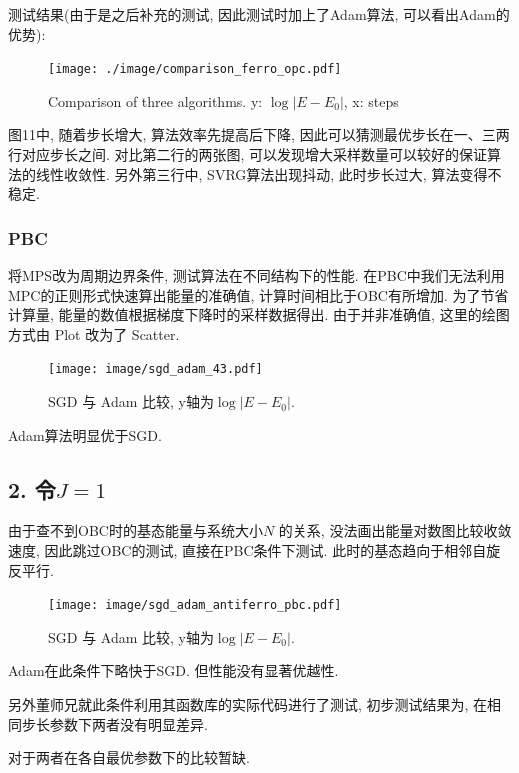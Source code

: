 \documentclass{article}
\begin{document}
\clearpage\noindent
测试结果(由于是之后补充的测试, 因此测试时加上了Adam算法, 可以看出Adam的优势):
\begin{figure}[!ht]
	\centering
	\texttt{[image: ./image/comparison\_ferro\_opc.pdf]}
	\caption{Comparison of three algorithms. y: $\log\lvert E-E_0\rvert$, x: steps }
	\label{fig:comp1}
\end{figure}

图11中, 随着步长增大, 算法效率先提高后下降, 因此可以猜测最优步长在一、三两行对应步长之间. 对比第二行的两张图, 可以发现增大采样数量可以较好的保证算法的线性收敛性. 另外第三行中, SVRG算法出现抖动, 此时步长过大, 算法变得不稳定.

\clearpage
\subsubsection*{PBC}

将MPS改为周期边界条件, 测试算法在不同结构下的性能. 在PBC中我们无法利用MPC的正则形式快速算出能量的准确值, 计算时间相比于OBC有所增加. 为了节省计算量, 能量的数值根据梯度下降时的采样数据得出. 由于并非准确值, 这里的绘图方式由 Plot 改为了 Scatter.

\begin{figure}[!h]
	\centering
	\texttt{[image: image/sgd\_adam\_43.pdf]}
	\caption{SGD 与 Adam 比较, y轴为$\log\lvert E-E_0 \rvert$.}
	\label{fig:SGD_Adam_PBC}
\end{figure}
Adam算法明显优于SGD.

\clearpage
\subsection*{2. 令$J = 1$}
由于查不到OBC时的基态能量与系统大小$N$ 的关系, 没法画出能量对数图比较收敛速度, 因此跳过OBC的测试, 直接在PBC条件下测试. 此时的基态趋向于相邻自旋反平行. 

\begin{figure}[!h]
	\centering
\texttt{[image: image/sgd\_adam\_antiferro\_pbc.pdf]}
	\caption{SGD 与 Adam 比较, y轴为$\log\lvert E-E_0 \rvert$.}
	\label{fig:SGD_Adam_PBC}
\end{figure}
Adam在此条件下略快于SGD. 但性能没有显著优越性.

另外董师兄就此条件利用其函数库的实际代码进行了测试, 初步测试结果为, 在相同步长参数下两者没有明显差异. 

对于两者在各自最优参数下的比较暂缺.

\clearpage





\end{document}
